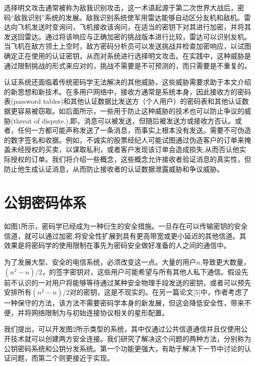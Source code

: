 \documentclass[]{article}
\begin{document}
	选择明文攻击通常被称为敌我识别攻击，这一术语起源于第二次世界大战后，密码“敌我识别”系统的发展。敌我识别系统使军用雷达能够自动区分友机和敌机。雷达向飞机发送时变询问，飞机接收该询问，在适当的密钥下对其进行加密，并将其发送回雷达。通过将该响应与正确加密的挑战版本进行比较，雷达可以识别友机。当飞机在敌方领土上空时，敌方密码分析员可以发送挑战并检查加密响应，以试图确定正在使用的认证密钥，从而对系统进行选择明文攻击。在实践中，这种威胁是通过限制挑战的形式来应对的，挑战不需要是不可预测的，而只需要是不重复的。
	
	
	认证系统还面临着传统密码学无法解决的其他威胁，这些威胁需要求助于本文介绍的新思想和新技术。在多用户网络中，接收方通常是系统本身，因此接收方的密码表(password tables)和其他认证数据比发送方（个人用户）的密码表和其他认证数据更容易被窃取。如后面所示，一些用于防止这种威胁的技术也可以防止争议的威胁(threat of dispute.),即，消息可以被发送，但随后被发送方或接收方否认。或者，任何一方都可能声称发送了一条消息，而事实上根本没有发送。需要不可伪造的数字签名和收据。例如，不诚实的股票经纪人可能试图通过伪造客户的订单来掩盖未经授权的买卖，以谋取私利，或者客户发现该订单会造成损失,从而否认他实际授权的订单。我们将介绍一些概念，这些概念允许接收者验证消息的真实性，但防止他生成认证消息，从而防止接收者的认证数据泄露威胁和争议威胁。
	
	\section{公钥密码体系}
	
	如图1所示，密码学已经成为一种衍生的安全措施。一旦存在可以传输密钥的安全信道，就可以通过加密,将安全性扩展到具有更高带宽或更小延迟的其他信道。其效果是将密码学的使用限制在事先为密码安全做好准备的人之间的通信中。
	
	为了发展大型、安全的电信系统，必须改变这一点。大量的用户$n$,导致更大数量，$(n^2-n)/2$，的签字密钥对，这些用户可能希望与所有其他人私下通信。假设先前不认识的一对用户将能够等待通过某种安全物理手段发送的密钥，或者可以预先安排所有$(n^2-n)/2$对的密钥，这是不现实的。在另一篇论文[5]中，作者考虑了一种保守的方法，该方法不需要密码学本身的新发展，但这会降低安全性，带来不便，并将网络限制为与初始连接协议相关的星形配置。
	
	我们提出，可以开发图2所示类型的系统，其中仅通过公共信道通信并且仅使用公开技术就可以创建两方安全连接。我们研究了解决这个问题的两种方法，分别称为公钥密码系统和公钥分发系统。第一个功能更强大，有助于解决下一节中讨论的认证问题，而第二个则更接近于实现。
	
\end{document}
